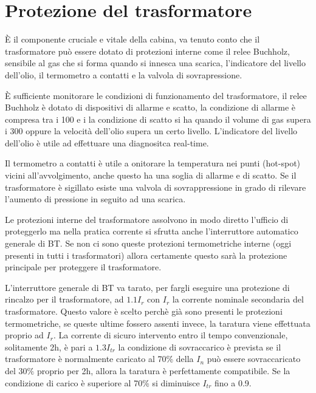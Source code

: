 \section{Protezione del trasformatore}
È il componente cruciale e vitale della cabina, va tenuto conto che il trasformatore può essere dotato di protezioni interne come il relee Buchholz, sensibile al gas che si forma quando si innesca una scarica, l'indicatore del livello dell'olio, il termometro a contatti e la valvola di sovrapressione.

È sufficiente monitorare le condizioni di funzionamento del trasformatore, il relee Buchholz è dotato di dispositivi di allarme e scatto, la condizione di allarme è compresa tra i 100 e i 
la condizione di scatto si ha quando il volume di gas supera i 300 oppure la velocità dell'olio supera un certo livello.
L'indicatore del livello dell'olio è utile ad effettuare una diagnositca real-time.

Il termometro a contatti è utile a onitorare la temperatura nei punti 
(hot-spot) vicini all'avvolgimento, anche questo ha una soglia di allarme e di 
scatto.
Se il trasformatore è sigillato esiste una valvola di sovrappressione in grado 
di rilevare l'aumento di pressione in seguito ad una scarica.

Le protezioni interne del trasformatore assolvono in modo diretto l'ufficio di 
proteggerlo ma nella pratica corrente si sfrutta anche l'interruttore 
automatico generale di BT. Se non ci sono queste protezioni termometriche 
interne (oggi presenti in tutti i trasformatori) allora certamente questo sarà 
la protezione principale per proteggere il trasformatore.

L'interruttore generale di BT va tarato, per fargli eseguire una protezione di 
rincalzo per il trasformatore, ad $1.1I_r$ con $I_r$ la corrente nominale 
secondaria del trasformatore.
Questo valore è scelto perchè già sono presenti le protezioni termometriche, se 
queste ultime fossero assenti invece, la taratura viene effettuata proprio ad $I_r$. La corrente di sicuro intervento entro il tempo convenzionale, 
solitamente 2h, è pari a $1.3 I_{tr}$ la condizione di sovraccarico è prevista 
se il trasformatore è normalmente caricato al 70\% della $I_n$ può essere 
sovraccaricato del $30\%$ proprio per 2h, allora la taratura è perfettamente 
compatibile. Se la condizione di carico è superiore al 70\% si diminuisce $I_{tr}$ fino a 0.9. 

